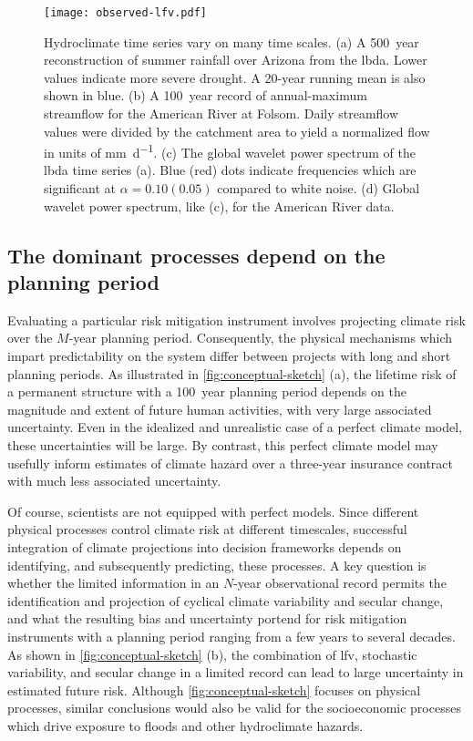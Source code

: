 \documentclass[
  draft,
  linenumbers
]{agujournal2019}
\begin{document}
\begin{figure}
  \centering
  \texttt{[image: observed-lfv.pdf]}
  \caption{
    Hydroclimate time series vary on many time scales.
    (a) A \SI{500}{year} reconstruction of summer rainfall over Arizona from the \acrfull{lbda}.
    Lower values indicate more severe drought.
    A 20-year running mean is also shown in blue.
    (b) A \SI{100}{year} record of annual-maximum streamflow for the American River at Folsom.
    Daily streamflow values were divided by the catchment area to yield a normalized flow in units of \si{\milli\meter\per\day}.
    (c) The global wavelet power spectrum of the \gls{lbda} time series (a).
    Blue (red) dots indicate frequencies which are significant at $\alpha=0.10(0.05)$ compared to white noise.
    (d) Global wavelet power spectrum, like (c), for the American River data.
  }\label{fig:observed-lfv}
\end{figure}

\subsection{The dominant processes depend on the planning period}\label{sec:intro-dominant}

Evaluating a particular risk mitigation instrument involves projecting climate risk over the $M$-year planning period.
Consequently, the physical mechanisms which impart predictability on the system differ between projects with long and short planning periods.
As illustrated in \cref{fig:conceptual-sketch} (a), the lifetime risk of a permanent structure with a \SI{100}{year} planning period depends on the magnitude and extent of future human activities, with very large associated uncertainty.
Even in the idealized and unrealistic case of a perfect climate model, these uncertainties will be large.
By contrast, this perfect climate model may usefully inform estimates of climate hazard over a three-year insurance contract with much less associated uncertainty.

Of course, scientists are not equipped with perfect models.
Since different physical processes control climate risk at different timescales, successful integration of climate projections into decision frameworks depends on identifying, and subsequently predicting, these processes.
A key question is whether the limited information in an $N$-year observational record permits the identification and projection of cyclical climate variability and secular change, and what the resulting bias and uncertainty portend for risk mitigation instruments with a planning period ranging from a few years to several decades.
As shown in \cref{fig:conceptual-sketch} (b), the combination of \gls{lfv}, stochastic variability, and secular change in a limited record can lead to large uncertainty in estimated future risk.
Although \cref{fig:conceptual-sketch} focuses on physical processes, similar conclusions would also be valid for the socioeconomic processes which drive exposure to floods and other hydroclimate hazards.
\end{document}
